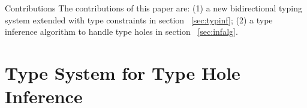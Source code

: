 

\par{Contributions} The contributions of this paper are: (1) a new bidirectional typing system extended with type constraints in section ~\ref{sec:typinf}; (2) a type inference algorithm to handle type holes in section ~\ref{sec:infalg}.



\section{Type System for Type Hole Inference}

